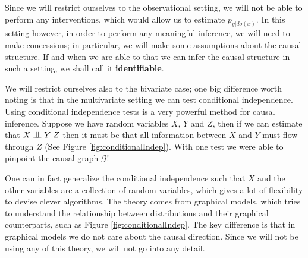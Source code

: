 Since we will restrict ourselves to the observational setting, we will not be able to perform any interventions,
which would allow us to estimate $p_{y|do(x)}$. In this setting however, in order to perform any meaningful
inference, we will need to make concessions; in particular, we will make some assumptions about 
the causal structure. If and when we are able to that we can infer the causal structure in such a setting, we 
shall call it \textbf{identifiable}.



We will restrict ourselves also to the bivariate case; one big difference worth noting is that in the
multivariate setting we can test conditional independence. Using conditional independence tests 
is a very powerful method for causal inference. Suppose 
we have random variables $X$, $Y$ and $Z$, then if we can estimate that $X \bigCI Y | Z$ then it must be 
that all information between $X$ and $Y$ must flow through $Z$ (See Figure \ref{fig:conditionalIndep}).
With one test we were able to pinpoint the causal graph $\mathcal{G}$! 

One can in fact generalize the conditional independence such that $X$ and the other variables are 
a collection of random variables, which gives a lot of flexibility to devise clever algorithms. 
The theory comes from graphical models, which tries to understand the relationship between 
distributions and their graphical counterparts, such as Figure \ref{fig:conditionalIndep}.
The key difference is that in graphical models we do not care about the causal direction. 
Since we will not be using any of this theory, we will not go into any detail. 

